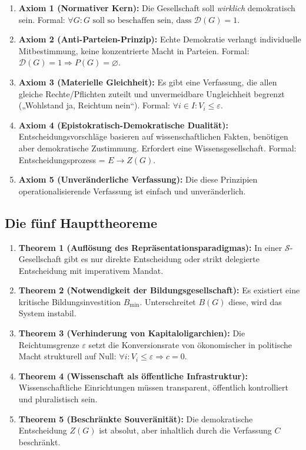 \begin{enumerate}
    \item \textbf{Axiom 1 (Normativer Kern):} Die Gesellschaft soll \emph{wirklich} demokratisch sein. Formal: $\forall G: G \text{ soll so beschaffen sein, dass } \mathcal{D}(G) = 1$.
    
    \item \textbf{Axiom 2 (Anti-Parteien-Prinzip):} Echte Demokratie verlangt individuelle Mitbestimmung, keine konzentrierte Macht in Parteien. Formal: $\mathcal{D}(G) = 1 \Rightarrow P(G) = \varnothing$.
    
    \item \textbf{Axiom 3 (Materielle Gleichheit):} Es gibt eine Verfassung, die allen gleiche Rechte/Pflichten zuteilt und unvermeidbare Ungleichheit begrenzt („Wohlstand ja, Reichtum nein“). Formal: $\forall i \in I: V_i \leq \varepsilon$.
    
    \item \textbf{Axiom 4 (Epistokratisch-Demokratische Dualität):} Entscheidungsvorschläge basieren auf wissenschaftlichen Fakten, benötigen aber demokratische Zustimmung. Erfordert eine Wissensgesellschaft. Formal: Entscheidungsprozess = $E \longrightarrow Z(G)$.
    
    \item \textbf{Axiom 5 (Unveränderliche Verfassung):} Die diese Prinzipien operationalisierende Verfassung ist einfach und unveränderlich.
\end{enumerate}

\subsection*{Die fünf Haupttheoreme}

\begin{enumerate}
    \item \textbf{Theorem 1 (Auflösung des Repräsentationsparadigmas):} In einer $\mathcal{S}$-Gesellschaft gibt es nur direkte Entscheidung oder strikt delegierte Entscheidung mit imperativem Mandat.
    
    \item \textbf{Theorem 2 (Notwendigkeit der Bildungsgesellschaft):} Es existiert eine kritische Bildungsinvestition $B_{\min}$. Unterschreitet $B(G)$ diese, wird das System instabil.
    
    \item \textbf{Theorem 3 (Verhinderung von Kapitaloligarchien):} Die Reichtumsgrenze $\varepsilon$ setzt die Konversionsrate von ökonomischer in politische Macht strukturell auf Null: $\forall i: V_i \leq \varepsilon \Rightarrow c = 0$.
    
    \item \textbf{Theorem 4 (Wissenschaft als öffentliche Infrastruktur):} Wissenschaftliche Einrichtungen müssen transparent, öffentlich kontrolliert und pluralistisch sein.
    
    \item \textbf{Theorem 5 (Beschränkte Souveränität):} Die demokratische Entscheidung $Z(G)$ ist absolut, aber inhaltlich durch die Verfassung $C$ beschränkt.
\end{enumerate}

